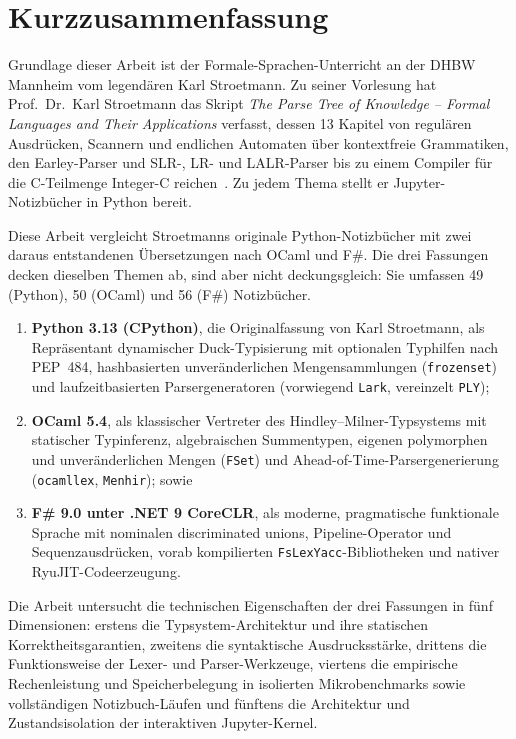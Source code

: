 \documentclass[
  12pt,
  a4paper,
  oneside,
  numbers=noenddot,
  chapterprefix=false,
  headings=normal,
  toc=listof,
  toc=bibliography,
  parskip=half-
]{scrreprt}
\begin{document}
\chapter*{Kurzzusammenfassung}

Grundlage dieser Arbeit ist der Formale-Sprachen-Unterricht an der DHBW Mannheim vom legendären Karl Stroetmann.
Zu seiner Vorlesung hat Prof.~Dr.~Karl Stroetmann das Skript \emph{The Parse Tree of Knowledge -- Formal Languages and Their Applications} verfasst, dessen 13 Kapitel von regulären Ausdrücken, Scannern und endlichen Automaten über kontextfreie Grammatiken, den Earley-Parser und SLR-, LR- und LALR-Parser bis zu einem Compiler für die C-Teilmenge Integer-C reichen~\cite{stroetmann2026formal}.
Zu jedem Thema stellt er Jupyter-Notizbücher in Python bereit.

Diese Arbeit vergleicht Stroetmanns originale Python-Notizbücher mit zwei daraus entstandenen Übersetzungen nach OCaml und F\#.
Die drei Fassungen decken dieselben Themen ab, sind aber nicht deckungsgleich: Sie umfassen 49 (Python), 50 (OCaml) und 56 (F\#) Notizbücher.
\begin{enumerate}
  \item \textbf{Python 3.13 (CPython)}, die Originalfassung von Karl Stroetmann, als Repräsentant dynamischer Duck-Typisierung mit optionalen Typhilfen nach PEP~484, hashbasierten unveränderlichen Mengensammlungen (\texttt{frozenset}) und laufzeitbasierten Parsergeneratoren (vorwiegend \texttt{Lark}, vereinzelt \texttt{PLY});
  \item \textbf{OCaml 5.4}, als klassischer Vertreter des Hindley--Milner-Typsystems mit statischer Typinferenz, algebraischen Summentypen, eigenen polymorphen und unveränderlichen Mengen (\texttt{FSet}) und Ahead-of-Time-Parsergenerierung (\texttt{ocamllex}, \texttt{Menhir}); sowie
  \item \textbf{F\# 9.0 unter .NET 9 CoreCLR}, als moderne, pragmatische funktionale Sprache mit nominalen discriminated unions, Pipeline-Operator und Sequenzausdrücken, vorab kompilierten \texttt{FsLexYacc}-Bibliotheken und nativer RyuJIT-Codeerzeugung.
\end{enumerate}

Die Arbeit untersucht die technischen Eigenschaften der drei Fassungen in fünf Dimensionen: erstens die Typsystem-Architektur und ihre statischen Korrektheitsgarantien, zweitens die syntaktische Ausdrucksstärke, drittens die Funktionsweise der Lexer- und Parser-Werkzeuge, viertens die empirische Rechenleistung und Speicherbelegung in isolierten Mikrobenchmarks sowie vollständigen Notizbuch-Läufen und fünftens die Architektur und Zustandsisolation der interaktiven Jupyter-Kernel.
\end{document}
